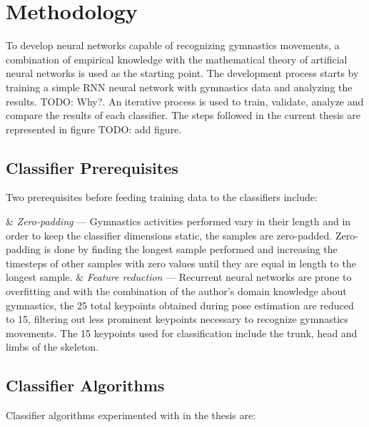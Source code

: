\section{Methodology}

To develop neural networks capable of recognizing gymnastics movements, a combination of empirical knowledge with the mathematical theory of artificial neural networks is used as the starting point. The development process starts by training a simple RNN neural network with gymnastics data and analyzing the results. TODO: Why?. An iterative process is used to train, validate, analyze and compare the results of each classifier. The steps followed in the current thesis are represented in figure TODO: add figure.

\subsection{Classifier Prerequisites}

Two prerequisites before feeding training data to the classifiers include:

\begin{easylist}[itemize]

& \textit{Zero-padding} --- Gymnastics activities performed vary in their length and in order to keep the classifier dimensions static, the samples are zero-padded. Zero-padding is done by finding the longest sample performed and increasing the timesteps of other samples with zero values until they are equal in length to the longest sample. 
& \textit{Feature reduction} --- Recurrent neural networks are prone to overfitting and with the combination of the author's domain knowledge about gymnastics, the 25 total keypoints obtained during pose estimation are reduced to 15, filtering out less prominent keypoints necessary to recognize gymnastics movements. The 15 keypoints used for classification include the trunk, head and limbs of the skeleton.

\end{easylist}


\subsection{Classifier Algorithms}

Classifier algorithms experimented with in the thesis are:

